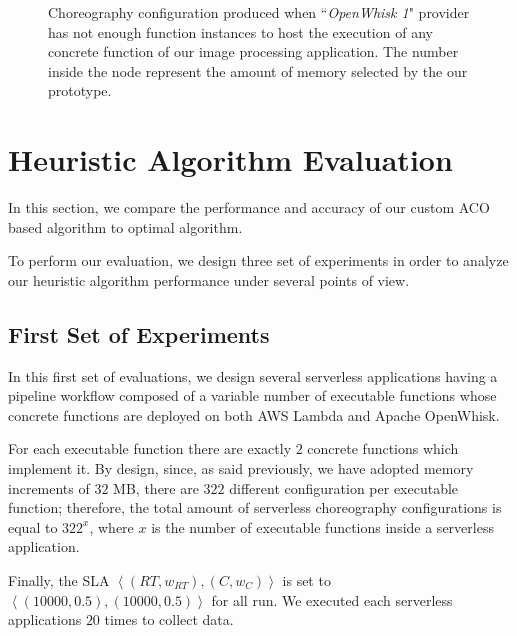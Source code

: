 \documentclass[12pt,a4paper]{report}
\newcommand{\ItalicQuotMark}[1]{``\textit{#1}"}
\begin{document}
\begin{figure}[!ht]
\begin{tikzpicture}
	\end{tikzpicture}
	\caption{Choreography configuration produced when \ItalicQuotMark{OpenWhisk 1} provider has not enough function instances to host the execution of any concrete function of our image processing application. The number inside the node represent the amount of memory selected by the our prototype.}
	\label{imageProcessingAppStep2}
\end{figure}



\newpage
\section{Heuristic Algorithm Evaluation}

In this section, we compare the performance and accuracy of our custom ACO based algorithm to optimal algorithm. 

To perform our evaluation, we design three set of experiments in order to analyze our heuristic algorithm performance under several points of view.

\subsection{First Set of Experiments}

In this first set of evaluations, we design several serverless applications having a pipeline workflow composed of a variable number of executable functions whose concrete functions are deployed on both AWS Lambda and Apache OpenWhisk. 

For each executable function there are exactly $2$ concrete functions which implement it.  By design, since, as said previously, we have adopted memory increments of $32$ MB, there are $322$ different configuration per executable function; therefore, the total amount of serverless choreography configurations is equal to $322^{x}$, where $x$ is the number of executable functions inside a serverless application.

Finally, the SLA $\left\langle (RT,w_{RT}),(C,w_{C}) \right\rangle$ is set to $\left\langle (10000,0.5),(10000,0.5) \right\rangle$ for all run. We executed each serverless applications $20$ times to collect data.
\end{document}
